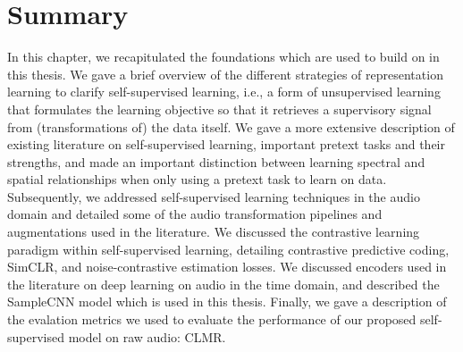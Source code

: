 \section*{Summary}
In this chapter, we recapitulated the foundations which are used to build on in this thesis. We gave a brief overview of the different strategies of representation learning to clarify self-supervised learning, i.e., a form of unsupervised learning that formulates the learning objective so that it retrieves a supervisory signal from (transformations of) the data itself. We gave a more extensive description of existing literature on self-supervised learning, important pretext tasks and their strengths, and made an important distinction between learning spectral and spatial relationships when only using a pretext task to learn on data. Subsequently, we addressed self-supervised learning techniques in the audio domain and detailed some of the audio transformation pipelines and augmentations used in the literature. We discussed the contrastive learning paradigm within self-supervised learning, detailing contrastive predictive coding, SimCLR, and noise-contrastive estimation losses. We discussed encoders used in the literature on deep learning on audio in the time domain, and described the SampleCNN model which is used in this thesis. Finally, we gave a description of the evalation metrics we used to evaluate the performance of our proposed self-supervised model on raw audio: CLMR.